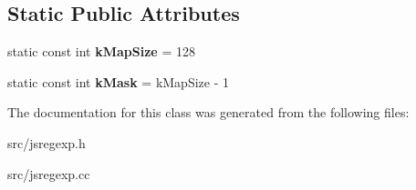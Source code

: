 \subsection*{Static Public Attributes}
\begin{DoxyCompactItemize}
\item 
\hypertarget{classv8_1_1internal_1_1_boyer_moore_position_info_ab8b1a1e04adfde8ed8c5706d6dc2a9e0}{}static const int {\bfseries k\+Map\+Size} = 128\label{classv8_1_1internal_1_1_boyer_moore_position_info_ab8b1a1e04adfde8ed8c5706d6dc2a9e0}

\item 
\hypertarget{classv8_1_1internal_1_1_boyer_moore_position_info_a4750e1206c312d908d4b503c8efdc3a8}{}static const int {\bfseries k\+Mask} = k\+Map\+Size -\/ 1\label{classv8_1_1internal_1_1_boyer_moore_position_info_a4750e1206c312d908d4b503c8efdc3a8}

\end{DoxyCompactItemize}


The documentation for this class was generated from the following files\+:\begin{DoxyCompactItemize}
\item 
src/jsregexp.\+h\item 
src/jsregexp.\+cc\end{DoxyCompactItemize}
